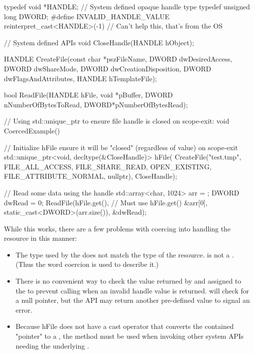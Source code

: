 \documentclass[ebook,11pt,article]{memoir}
\begin{document}
\begin{codeblock}
typedef void *HANDLE;        // System defined opaque handle type
typedef unsigned long DWORD;
#define INVALID_HANDLE_VALUE reinterpret_cast<HANDLE>(-1)	
// Can't help this, that's from the OS

// System defined APIs
void CloseHandle(HANDLE hObject);

HANDLE CreateFile(const char *pszFileName, 
	DWORD dwDesiredAccess, 
	DWORD dwShareMode, 
	DWORD dwCreationDisposition, 
	DWORD dwFlagsAndAttributes, 
	HANDLE hTemplateFile);

bool ReadFile(HANDLE hFile, 
	void *pBuffer, 
	DWORD nNumberOfBytesToRead, 
	DWORD*pNumberOfBytesRead);

// Using std::unique_ptr to ensure file handle is closed on scope-exit:
void CoercedExample()
{
	// Initialize hFile ensure it will be "closed" (regardless of value) on scope-exit
	std::unique_ptr<void, decltype(&CloseHandle)> hFile(
		CreateFile("test.tmp", 
			FILE_ALL_ACCESS, 
			FILE_SHARE_READ, 
			OPEN_EXISTING, 
			FILE_ATTRIBUTE_NORMAL,
			nullptr), 
		CloseHandle);

	// Read some data using the handle
	std::array<char, 1024> arr = { };
	DWORD dwRead = 0;
	ReadFile(hFile.get(),	// Must use hFile.get()
		&arr[0], 
		static_cast<DWORD>(arr.size()), 
		&dwRead);
}
\end{codeblock}

While this works, there are a few problems with coercing  into handling the resource in this manner:
\begin{itemize}
\item The type used by the  does not match the type of the resource.   is not a .  (Thus the word coercion is used to describe it.)
\item There is no convenient way to check the value returned by  and assigned to the  to prevent calling  when an invalid handle value is returned.   will check for a null pointer, but the  API may return another pre-defined value to signal an error.
\item Because hFile does not have a cast operator that converts the contained "pointer" to a , the  method must be used when invoking other system APIs needing the underlying .
\end{itemize}
\end{document}
